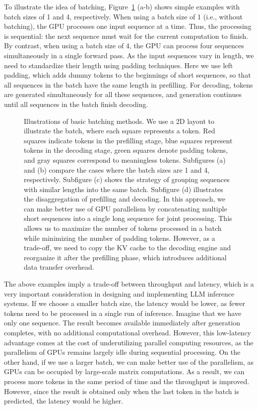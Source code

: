 To illustrate the idea of batching, Figure~\ref{fig:basic-llm-batching-methods} (a-b) shows simple examples with batch sizes of 1 and 4, respectively. When using a batch size of 1 (i.e., without batching), the GPU processes one input sequence at a time. Thus, the processing is sequential: the next sequence must wait for the current computation to finish. By contrast, when using a batch size of 4, the GPU can process four sequences simultaneously in a single forward pass. As the input sequences vary in length, we need to standardize their length using padding techniques. Here we use left padding, which adds dummy tokens to the beginnings of short sequences, so that all sequences in the batch have the same length in prefilling. For decoding, tokens are generated simultaneously for all these sequences, and generation continues until all sequences in the batch finish decoding.

\begin{figure}[!t]
\centering

\vspace{-0.5cm} \caption{Illustrations of basic batching methods. We use a 2D layout to illustrate the batch, where each square represents a token. Red squares indicate tokens in the prefilling stage, blue squares represent tokens in the decoding stage, green squares denote padding tokens, and gray squares correspond to meaningless tokens. Subfigures (a) and (b) compare the cases where the batch sizes are 1 and 4, respectively. Subfigure (c) shows the strategy of grouping sequences with similar lengths into the same batch. Subfigure (d) illustrates the disaggregation of prefilling and decoding. In this approach, we can make better use of GPU parallelism by concatenating multiple short sequences into a single long sequence for joint processing. This allows us to maximize the number of tokens processed in a batch while minimizing the number of padding tokens. However, as a trade-off, we need to copy the KV cache to the decoding engine and reorganize it after the prefilling phase, which introduces additional data transfer overhead.}
\label{fig:basic-llm-batching-methods}
\end{figure}

The above examples imply a trade-off between throughput and latency, which is a very important consideration in designing and implementing LLM inference systems. If we choose a smaller batch size, the latency would be lower, as fewer tokens need to be processed in a single run of inference. Imagine that we have only one sequence. The result becomes available immediately after generation completes, with no additional computational overhead. However, this low-latency advantage comes at the cost of underutilizing parallel computing resources, as the parallelism of GPUs remains largely idle during sequential processing. On the other hand, if we use a larger batch, we can make better use of the parallelism, as GPUs can be occupied by large-scale matrix computations. As a result, we can process more tokens in the same period of time and the throughput is improved. However, since the result is obtained only when the last token in the batch is predicted, the latency would be higher.

